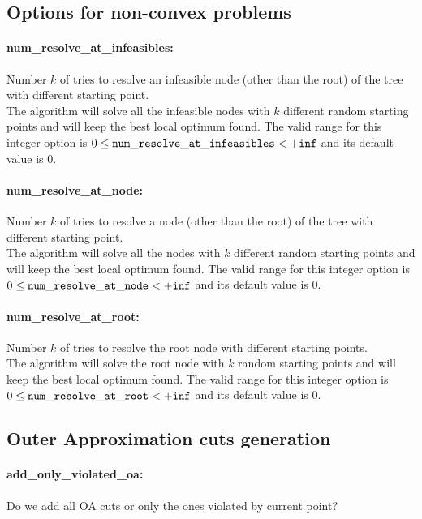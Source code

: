 \subsection{Options for non-convex problems}
\label{sec:Options_for_non-convex_problems}
\paragraph{num\_resolve\_at\_infeasibles:} Number $k$ of tries to resolve an infeasible node (other than the root) of the tree with different starting point. $\;$ \\
 The algorithm will solve all the infeasible nodes
with $k$ different random starting points and
will keep the best local optimum found. The valid range for this integer option is
$0 \le {\tt num\_resolve\_at\_infeasibles } <  {\tt +inf}$
and its default value is $0$.


\paragraph{num\_resolve\_at\_node:} Number $k$ of tries to resolve a node (other than the root) of the tree with different starting point. $\;$ \\
 The algorithm will solve all the nodes with $k$
different random starting points and will keep
the best local optimum found. The valid range for this integer option is
$0 \le {\tt num\_resolve\_at\_node } <  {\tt +inf}$
and its default value is $0$.


\paragraph{num\_resolve\_at\_root:} Number $k$ of tries to resolve the root node with different starting points. $\;$ \\
 The algorithm will solve the root node with $k$
random starting points and will keep the best
local optimum found. The valid range for this integer option is
$0 \le {\tt num\_resolve\_at\_root } <  {\tt +inf}$
and its default value is $0$.


\subsection{Outer Approximation cuts generation}
\label{sec:Outer_Approximation_cuts_generation}
\paragraph{add\_only\_violated\_oa:} Do we add all OA cuts or only the ones violated by current point? $\;$ \\


